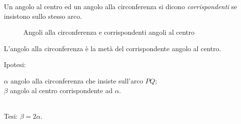 \begin{definizione}
Un angolo al centro ed un angolo alla circonferenza si dicono 
\emph{corrispondenti} se insistono sullo stesso arco.
\end{definizione}


\begin{inaccessibleblock}
 \begin{figure}[htb]\label{fig:ang_circonf}
  \centering
  \caption{Angoli alla circonferenza e corrispondenti angoli al 
centro}
\end{figure}
\end{inaccessibleblock}

\begin{teorema}
L'angolo alla circonferenza è la metà del corrispondente angolo al 
centro.
\end{teorema}

\noindent \begin{minipage}{0.09\textwidth} Ipotesi: \end{minipage} \begin{minipage}{0.6\textwidth} \(\alpha\) angolo alla circonferenza che insiste 
sull'arco \(PQ\); \\ \(\beta\) angolo al centro corrispondente ad \(\alpha\).
\end{minipage}\\

Tesi: \hspace{10pt} \(\beta = 2\alpha\).


